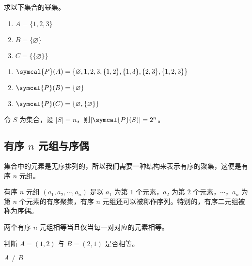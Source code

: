 \begin{collections}
    \begin{example}
        求以下集合的幂集。
        \begin{enumerate}
            \item $A = \{1, 2, 3\}$
            \item $B = \{ \varnothing \}$
            \item $C = \{\{ \varnothing \}\}$
        \end{enumerate}
    \end{example}
    \begin{solution}
        \begin{enumerate}
            \item $\symcal{P}(A) = \{\varnothing, 1, 2, 3, \{1, 2\}, \{1, 3\}, \{2, 3\}, \{1, 2, 3\}\}$
            \item $\symcal{P}(B) = \{\varnothing\}$
            \item $\symcal{P}(C) = \{\varnothing, \{\varnothing\}\}$
        \end{enumerate}
    \end{solution}
\end{collections}

\begin{theorem}
    令 $S$ 为集合，设 $|S| = n$，则$|\symcal{P}(S)| = 2^n$。
\end{theorem}

\subsection{有序 $n$ 元组与序偶}
集合中的元素是无序排列的，所以我们需要一种结构来表示有序的聚集，这便是有序 $n$ 元组。
\begin{definition}[有序 $n$ 元组与序偶]\label{def:有序n元组与序偶}
    有序 $n$ 元组 $(a_1, a_2, \cdots, a_n)$ 是以 $a_1$ 为第 $1$ 个元素，$a_2$ 为第 $2$ 个元素，$\cdots$，$a_n$ 为第 $n$ 个元素的有序聚集，有序 $n$ 元组还可以被称作序列。特别的，有序二元组被称为序偶。
\end{definition}

两个有序 $n$ 元组相等当且仅当每一对对应的元素相等。
\begin{collections}
    \begin{example}
        判断 $A=(1, 2)$ 与 $B=(2, 1)$ 是否相等。
    \end{example}
    \begin{solution}
        $A \neq B$
    \end{solution}
\end{collections}

